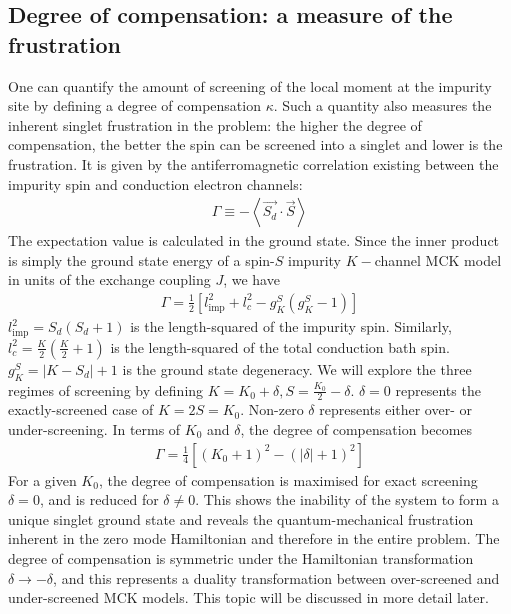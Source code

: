 \documentclass[reprint,prb,superscriptaddress]{revtex4-2}
\begin{document}
{ }

\subsection{Degree of compensation: a measure of the frustration}
One can quantify the amount of screening of the local moment at the impurity site by defining a degree of compensation \(\kappa\). Such a quantity also measures the inherent singlet frustration in the problem: the higher the degree of compensation, the better the spin can be screened into a singlet and lower is the frustration. It is given by the antiferromagnetic correlation existing between the impurity spin and conduction electron channels:
\begin{equation}\begin{aligned}
	\Gamma \equiv - \left< \vec{S_d}\cdot \vec{S}\right>
\end{aligned}\end{equation}
The expectation value is calculated in the ground state. Since the inner product is simply the ground state energy of a spin-\(S\) impurity \(K-\)channel MCK model in units of the exchange coupling \(J\), we have
\begin{equation}\begin{aligned}
	\Gamma = \frac{1}{2} \left[ l_\text{imp}^2 + l_c^2 - g^S_K\left( g^S_K - 1 \right)\right]
\end{aligned}\end{equation}
\(l_\text{imp}^2 = S_d(S_d+1)\) is the length-squared of the impurity spin. Similarly, \(l_c^2 = \frac{K}{2}\left(\frac{K}{2} + 1\right) \) is the length-squared of the total conduction bath spin. \(g^S_K = |K - S_d| + 1\) is the ground state degeneracy. We will explore the three regimes of screening by defining \(K = K_0 + \delta, S = \frac{K_0}{2} - \delta\). \(\delta=0\) represents the exactly-screened case of \(K = 2S = K_0\). Non-zero \(\delta\) represents either over- or under-screening. In terms of \(K_0\) and \(\delta\), the degree of compensation becomes
\begin{equation}\begin{aligned}
	\label{gamma}
	\Gamma = \frac{1}{4}\left[\left( K_0 + 1 \right) ^2 - \left(|\delta| + 1 \right) ^2\right] 
\end{aligned}\end{equation}
{For a given \(K_0\), the degree of compensation is maximised for exact screening \(\delta=0\), and is reduced for \(\delta \neq 0\). This shows the inability of the system to form a unique singlet ground state and reveals the quantum-mechanical frustration inherent in the zero mode Hamiltonian and therefore in the entire problem.} The degree of compensation is symmetric under the Hamiltonian transformation \(\delta \to -\delta\), and this represents a duality transformation between over-screened and under-screened MCK models. This topic will be discussed in more detail later.
\end{document}
